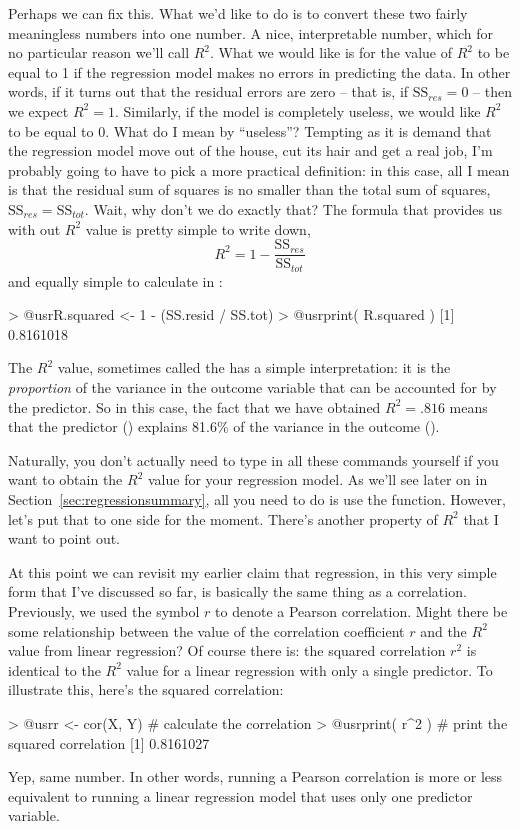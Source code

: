 Perhaps we can fix this. What we'd like to do is to convert these two fairly meaningless numbers into one number. A nice, interpretable number, which for no particular reason we'll call $R^2$. What we would like is for the value of $R^2$ to be equal to 1 if the regression model makes no errors in predicting the data. In other words, if it turns out that the residual errors are zero -- that is, if $\mbox{SS}_{res} = 0$ -- then we expect $R^2 = 1$. Similarly, if the model is completely useless, we would like $R^2$ to be equal to 0. What do I mean by ``useless''? Tempting as it is demand that the regression model move out of the house, cut its hair and get a real job, I'm probably going to have to pick a more practical definition: in this case, all I mean is that the residual sum of squares is no smaller than the total sum of squares, $\mbox{SS}_{res} = \mbox{SS}_{tot}$. Wait, why don't we do exactly that? The formula that provides us with out $R^2$ value is pretty simple to write down,
$$
R^2 = 1 - \frac{\mbox{SS}_{res}}{\mbox{SS}_{tot}}
$$
and equally simple to calculate in \R:
\begin{rblock1}
> @usr{R.squared <- 1 - (SS.resid / SS.tot)}
> @usr{print( R.squared )}
[1] 0.8161018
\end{rblock1}
The $R^2$ value, sometimes called the  has a simple interpretation: it is the {\it proportion} of the variance in the outcome variable that can be accounted for by the predictor. So in this case, the fact that we have obtained $R^2 = .816$ means that the predictor () explains 81.6\% of the variance in the outcome (). 

Naturally, you don't actually need to type in all these commands yourself if you want to obtain the $R^2$ value for your regression model. As we'll see later on in Section~\ref{sec:regressionsummary}, all you need to do is use the  function. However, let's put that to one side for the moment. There's another property of $R^2$ that I want to point out. 


At this point we can revisit my earlier claim that regression, in this very simple form that I've discussed so far, is basically the same thing as a correlation. Previously, we used the symbol $r$ to denote a Pearson correlation. Might there be some relationship between the value of the correlation coefficient $r$ and the $R^2$ value from linear regression? Of course there is: the squared correlation $r^2$ is identical to the $R^2$ value for a linear regression with only a single predictor. To illustrate this, here's the squared correlation:
\begin{rblock1}
> @usr{r <- cor(X, Y)}  # calculate the correlation
> @usr{print( r^2 )}    # print the squared correlation
[1] 0.8161027
\end{rblock1}
Yep, same number. In other words, running a Pearson correlation is more or less equivalent to running a linear regression model that uses only one predictor variable.

